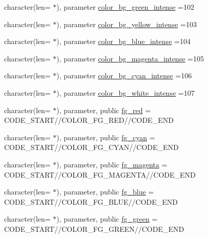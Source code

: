 \begin{DoxyCompactItemize}
\item 
character(len= $\ast$), parameter \mbox{\hyperlink{namespacem__escape_a9ee5d5f2d0522ca3ea194de4d9a05dc3}{color\+\_\+bg\+\_\+green\+\_\+intense}} =\textquotesingle{}102\textquotesingle{}
\item 
character(len= $\ast$), parameter \mbox{\hyperlink{namespacem__escape_a79f01235a5d3b2ea250274a7ca1c2c43}{color\+\_\+bg\+\_\+yellow\+\_\+intense}} =\textquotesingle{}103\textquotesingle{}
\item 
character(len= $\ast$), parameter \mbox{\hyperlink{namespacem__escape_aac30abbb8eb6e1570e28dac2326113a7}{color\+\_\+bg\+\_\+blue\+\_\+intense}} =\textquotesingle{}104\textquotesingle{}
\item 
character(len= $\ast$), parameter \mbox{\hyperlink{namespacem__escape_af148e03515e36ed552e330ba495bcbba}{color\+\_\+bg\+\_\+magenta\+\_\+intense}} =\textquotesingle{}105\textquotesingle{}
\item 
character(len= $\ast$), parameter \mbox{\hyperlink{namespacem__escape_a6be9fe26e904b8714e035412ae4e6ad4}{color\+\_\+bg\+\_\+cyan\+\_\+intense}} =\textquotesingle{}106\textquotesingle{}
\item 
character(len= $\ast$), parameter \mbox{\hyperlink{namespacem__escape_af57687b3c8741aaab4c67bc1c697aeda}{color\+\_\+bg\+\_\+white\+\_\+intense}} =\textquotesingle{}107\textquotesingle{}
\item 
character(len= $\ast$), parameter, public \mbox{\hyperlink{namespacem__escape_a615ac74b8d93904b5fb35fd656f18aa3}{fg\+\_\+red}} = C\+O\+D\+E\+\_\+\+S\+T\+A\+RT//C\+O\+L\+O\+R\+\_\+\+F\+G\+\_\+\+R\+ED//C\+O\+D\+E\+\_\+\+E\+ND
\item 
character(len= $\ast$), parameter, public \mbox{\hyperlink{namespacem__escape_abdd10ab49027c01752c5a165d42dca95}{fg\+\_\+cyan}} = C\+O\+D\+E\+\_\+\+S\+T\+A\+RT//C\+O\+L\+O\+R\+\_\+\+F\+G\+\_\+\+C\+Y\+AN//C\+O\+D\+E\+\_\+\+E\+ND
\item 
character(len= $\ast$), parameter, public \mbox{\hyperlink{namespacem__escape_a44464db3bf2f3277b04e505bf79061a4}{fg\+\_\+magenta}} = C\+O\+D\+E\+\_\+\+S\+T\+A\+RT//C\+O\+L\+O\+R\+\_\+\+F\+G\+\_\+\+M\+A\+G\+E\+N\+TA//C\+O\+D\+E\+\_\+\+E\+ND
\item 
character(len= $\ast$), parameter, public \mbox{\hyperlink{namespacem__escape_a94792b1429eb9880530d93643e9ce22c}{fg\+\_\+blue}} = C\+O\+D\+E\+\_\+\+S\+T\+A\+RT//C\+O\+L\+O\+R\+\_\+\+F\+G\+\_\+\+B\+L\+UE//C\+O\+D\+E\+\_\+\+E\+ND
\item 
character(len= $\ast$), parameter, public \mbox{\hyperlink{namespacem__escape_a1ada5ca3807f86e47be0b48c41e410c7}{fg\+\_\+green}} = C\+O\+D\+E\+\_\+\+S\+T\+A\+RT//C\+O\+L\+O\+R\+\_\+\+F\+G\+\_\+\+G\+R\+E\+EN//C\+O\+D\+E\+\_\+\+E\+ND

\end{DoxyCompactItemize}
